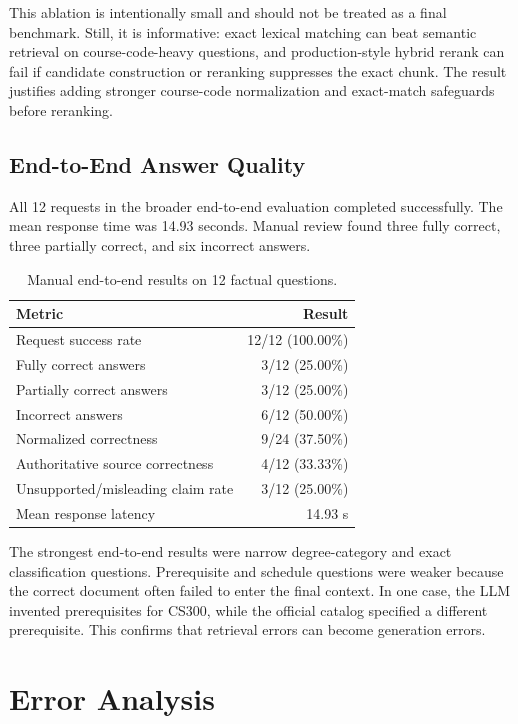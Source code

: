\documentclass[10pt,a4paper]{article}
\begin{document}
This ablation is intentionally small and should not be treated as a final benchmark. Still, it is informative: exact lexical matching can beat semantic retrieval on course-code-heavy questions, and production-style hybrid rerank can fail if candidate construction or reranking suppresses the exact chunk. The result justifies adding stronger course-code normalization and exact-match safeguards before reranking.

\subsection{End-to-End Answer Quality}

All 12 requests in the broader end-to-end evaluation completed successfully. The mean response time was 14.93 seconds. Manual review found three fully correct, three partially correct, and six incorrect answers.

\begin{table}[H]
\centering
\caption{Manual end-to-end results on 12 factual questions.}
\label{tab:e2e}
\small
\begin{tabularx}{0.78\linewidth}{Yr}
\toprule
\textbf{Metric} & \textbf{Result}\\
\midrule
Request success rate & 12/12 (100.00\%)\\
Fully correct answers & 3/12 (25.00\%)\\
Partially correct answers & 3/12 (25.00\%)\\
Incorrect answers & 6/12 (50.00\%)\\
Normalized correctness & 9/24 (37.50\%)\\
Authoritative source correctness & 4/12 (33.33\%)\\
Unsupported/misleading claim rate & 3/12 (25.00\%)\\
Mean response latency & 14.93 s\\
\bottomrule
\end{tabularx}
\end{table}

The strongest end-to-end results were narrow degree-category and exact classification questions. Prerequisite and schedule questions were weaker because the correct document often failed to enter the final context. In one case, the LLM invented prerequisites for CS300, while the official catalog specified a different prerequisite. This confirms that retrieval errors can become generation errors.

\section{Error Analysis}
\label{sec:error-analysis}
\end{document}
